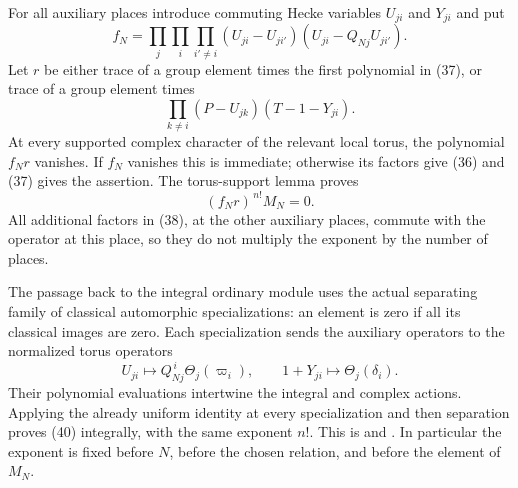 For all auxiliary places introduce commuting Hecke variables
$U_{ji}$ and $Y_{ji}$ and put
\[
 f_N=\prod_j\prod_i\prod_{i'\ne i}
            (U_{ji}-U_{ji'})(U_{ji}-Q_{Nj}U_{ji'}).
                                                               \tag{38}
\]
Let $r$ be either trace of a group element times the first
polynomial in (37), or trace of a group element times
\[
       \prod_{k\ne i}(P-U_{jk})(T-1-Y_{ji}).                    \tag{39}
\]
At every supported complex character of the relevant local
torus, the polynomial $f_Nr$ vanishes.
If $f_N$ vanishes this is immediate; otherwise its factors
give (36) and (37) gives the assertion.
The torus-support lemma proves
\[
                       (f_Nr)^{\,n!}M_N=0.                   \tag{40}
\]
All additional factors in (38), at the other auxiliary places,
commute with the operator at this place, so they do not
multiply the exponent by the number of places.

The passage back to the integral ordinary module uses the
actual separating family of classical automorphic
specializations: an element is zero if all its classical
images are zero.  Each specialization sends the auxiliary
operators to the normalized torus operators
\[
       U_{ji}\longmapsto Q_{Nj}^{\,i}\Theta_j(\varpi_i),
       \qquad 1+Y_{ji}\longmapsto\Theta_j(\delta_i).
\]
Their polynomial evaluations intertwine the integral and
complex actions.  Applying the already uniform identity
at every specialization and then separation proves (40)
integrally, with the same exponent $n!$.
This is  and
.
In particular the exponent is fixed before $N$, before the
chosen relation, and before the element of $M_N$.

